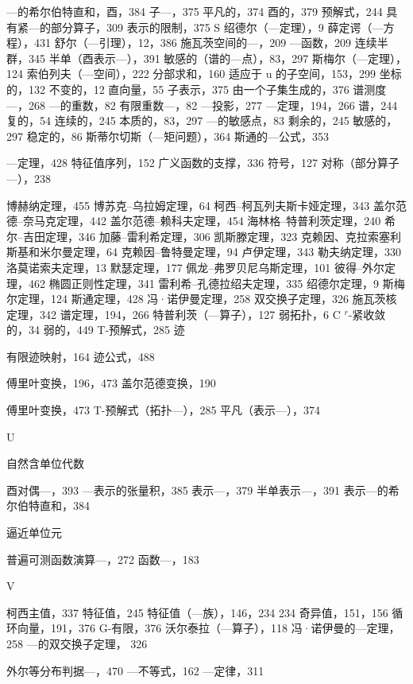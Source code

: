 ---的希尔伯特直和，酉，384 子---，375 平凡的，374 酉的，379 预解式，244 具有紧---的部分算子，309 表示的限制，375 S 绍德尔（---定理），9 薛定谔（---方程），431 舒尔（---引理），12，386 施瓦茨空间的---，209 ---函数，209 连续半群，345 半单（酉表示---），391 敏感的（谱的---点），83，297 斯梅尔（---定理），124 索伯列夫（---空间），222 分部求和，160 适应于 u 的子空间，153，299 坐标的，132 不变的，12 直向量，55 子表示，375 由一个子集生成的，376 谱测度---，268 ---的重数，82 有限重数---，82 ---投影，277 ---定理，194，266 谱，244 复的，54 连续的，245 本质的，83，297 ---的敏感点，83 剩余的，245 敏感的，297 稳定的，86 斯蒂尔切斯（---矩问题），364 斯通的---公式，353

---定理，428 特征值序列，152 广义函数的支撑，336 符号，127 对称（部分算子---），238


博赫纳定理，455 博苏克--乌拉姆定理，64 柯西--柯瓦列夫斯卡娅定理，343 盖尔范德--奈马克定理，442 盖尔范德--赖科夫定理，454 海林格--特普利茨定理，240 希尔--吉田定理，346 加藤--雷利希定理，306 凯斯滕定理，323 克赖因、克拉索塞利斯基和米尔曼定理，64 克赖因--鲁特曼定理，94 卢伊定理，343 勒夫纳定理，330 洛莫诺索夫定理，13 默瑟定理，177 佩龙--弗罗贝尼乌斯定理，101 彼得--外尔定理，462 椭圆正则性定理，341 雷利希--孔德拉绍夫定理，335 绍德尔定理，9 斯梅尔定理，124 斯通定理，428 冯·诺伊曼定理，258 双交换子定理，326 施瓦茨核定理，342 谱定理，194，266 特普利茨（---算子），127 弱拓扑，6 C \(^{r}\)-紧收敛的，34 弱的，449 T-预解式，285 迹

有限迹映射，164 迹公式，488

傅里叶变换，196，473 盖尔范德变换，190

傅里叶变换，473 T-预解式（拓扑---），285 平凡（表示---），374

U

自然含单位代数

酉对偶---，393 ---表示的张量积，385 表示---，379 半单表示---，391 表示---的希尔伯特直和，384

逼近单位元

普遍可测函数演算---，272 函数---，183

V

柯西主值，337 特征值，245 特征值（---族），146，234
234
奇异值，151，156 循环向量，191，376 G-有限，376 沃尔泰拉（---算子），118 冯·诺伊曼的---定理，258 ---的双交换子定理，
326

外尔等分布判据---，470 ---不等式，162 ---定律，311


